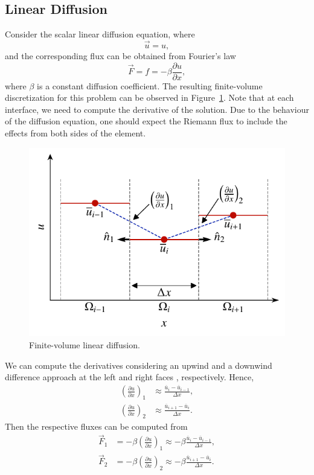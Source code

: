 \subsection{Linear Diffusion}
Consider the scalar linear diffusion equation, where
\begin{equation}
 \vec{u} = u,
\end{equation}
and the corresponding flux can be obtained from Fourier's law
\begin{equation}
 \vec{F} = f = -\beta \frac{\partial u}{\partial x},
\end{equation}
where $\beta$ is a constant diffusion coefficient. The resulting finite-volume discretization for this problem can be observed in Figure~\ref{fig:fv_diffusion}. Note that at each interface, we need to compute the derivative of the solution. Due to the behaviour of the diffusion equation, one should expect the Riemann flux to include the effects from both sides of the element.
\begin{figure}[htbp]
 \centering
 \includegraphics[width=0.5\linewidth]{Pictures/fv_diffusion}
 \caption{Finite-volume linear diffusion.}
 \label{fig:fv_diffusion}
\end{figure}
We can compute the derivatives considering an upwind and a downwind difference approach at the left and right faces , respectively. Hence,
\begin{align}
 \left(\frac{\partial u}{\partial x}\right)_1 & \approx \frac{\overline u_i - \overline u_{i-1}}{\Delta x}, \\
 \left(\frac{\partial u}{\partial x}\right)_2 & \approx \frac{\overline u_{i+1} - \overline u_{i}}{\Delta x}.
\end{align}
Then the respective fluxes can be computed from
\begin{align}
 \vec F_1 &=-\beta \left(\frac{\partial u}{\partial x}\right)_1 \approx -\beta \frac{\overline u_i - \overline u_{i-1}}{\Delta x},\\
 \vec F_2 &=-\beta \left(\frac{\partial u}{\partial x}\right)_2 \approx -\beta \frac{\overline u_{i+1} - \overline u_{i}}{\Delta x}.
\end{align}
